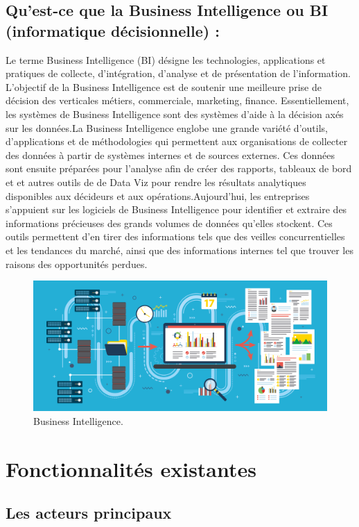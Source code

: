 \documentclass[a4paper, 12pt]{report}
\begin{document}
\subsection{Qu’est-ce que la Business Intelligence ou BI (informatique décisionnelle) : }
Le terme Business Intelligence (BI) désigne les technologies, applications et pratiques de collecte, d'intégration, d'analyse et de présentation de l'information. L'objectif de la Business Intelligence est de soutenir une meilleure prise de décision des verticales métiers, commerciale, marketing, finance. Essentiellement, les systèmes de Business Intelligence sont des systèmes d'aide à la décision axés sur les données.La Business Intelligence englobe une grande variété d'outils, d'applications et de méthodologies qui permettent aux organisations de collecter des données à partir de systèmes internes et de sources externes. Ces données sont ensuite préparées pour l'analyse afin de créer des rapports, tableaux de bord et et autres outils de de Data Viz pour rendre les résultats analytiques disponibles aux décideurs et aux opérations.Aujourd'hui, les entreprises s'appuient sur les logiciels de Business Intelligence pour identifier et extraire des informations précieuses des grands volumes de données qu'elles stockent. Ces outils permettent d’en tirer des informations tels que des veilles concurrentielles et les tendances du marché, ainsi que des informations internes tel que trouver les raisons des opportunités perdues.
\begin{figure}[H]
    \centering
    \includegraphics[width = 1\linewidth]{img/business-intelligence-4-01.png}
    \caption{Business Intelligence.}
\end{figure}
\section{Fonctionnalités existantes}

\subsection{Les acteurs principaux}
\end{document}
